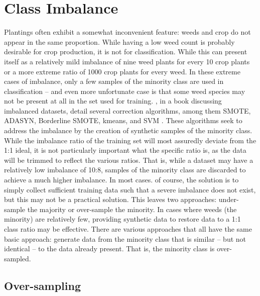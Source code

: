 \documentclass[letterpaper]{article}
\begin{document}
{\section{Class Imbalance}
Plantings often exhibit a somewhat inconvenient feature: weeds and crop do not appear in the same proportion. While having a low weed count is probably desirable for crop production, it is not for classification. While this can present itself as a relatively mild imbalance of nine weed plants for every 10 crop plants or a more extreme ratio of 1000 crop plants for every weed. In these extreme cases of imbalance, only a few samples of the minority class are used in classification -- and even more unfortunate case is that some weed species may not be present at all in the set used for training. \citeauthor{Fernandez2018-fw}, in a book discussing imbalanced datasets, detail several correction algorithms, among them SMOTE, ADASYN, Borderline SMOTE, kmeans, and SVM \parencite{Fernandez2018-fw}. These algorithms seek to address the imbalance by the creation of synthetic samples of the minority class. While the imbalance ratio of the training set will most assuredly deviate from the 1:1 ideal, it is not particularly important what the specific ratio is, as the data will be trimmed to reflect the various ratios. That is, while a dataset may have a relatively low imbalance of 10:8, samples of the minority class are discarded to achieve a much higher imbalance. In most cases. of course, the solution is to simply collect sufficient training data such that a severe imbalance does not exist, but this may not be a practical solution. This leaves two approaches: under-sample the majority or over-sample the minority. In cases where weeds (the minority) are relatively few, providing synthetic data to restore data to a 1:1 class ratio may be effective. There are various approaches that all have the same basic approach: generate data from the minority class that is similar -- but not identical -- to the data already present. That is, the minority class is over-sampled.

\subsection{Over-sampling}
\label{section:over}
}
\end{document}
